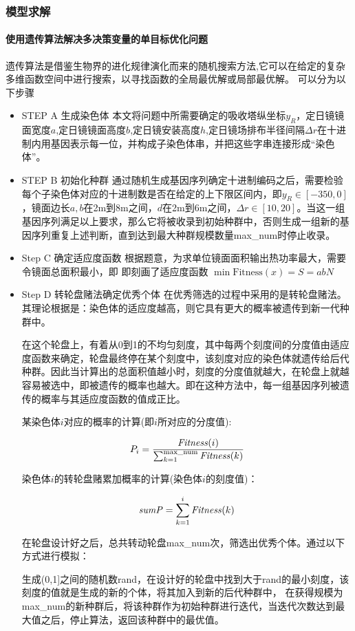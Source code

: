 \subsubsection{模型求解}
\paragraph{使用遗传算法解决多决策变量的单目标优化问题}
遗传算法是借鉴生物界的进化规律演化而来的随机搜索方法,它可以在给定的复杂多维函数空间中进行搜索，以寻找函数的全局最优解或局部最优解。
可以分为以下步骤
\begin{itemize}
\item STEP A 生成染色体
本文将问题中所需要确定的吸收塔纵坐标\(y_{R}\)，定日镜镜面宽度\(a\),定日镜镜面高度\(b\),定日镜安装高度\(h\),定日镜场排布半径间隔\(\Delta r\)在十进制内用基因表示每一位，并构成子染色体串，并把这些字串连接形成“染色体”。
\item 
STEP B    初始化种群
通过随机生成基因序列确定十进制编码之后，需要检验每个子染色体对应的十进制数是否在给定的上下限区间内，即\(y_{R} \in [-350 ,0]\)，镜面边长\(a, b\)在2m到8m之间，\(d\)在2m到6m之间，\(\Delta r \in [10, 20]\)。当这一组基因序列满足以上要求，那么它将被收录到初始种群中，否则生成一组新的基因序列重复上述判断，直到达到最大种群规模数量max\_num时停止收录。
\item 
Step C   确定适应度函数
根据题意，为求单位镜面面积输出热功率最大，需要令镜面总面积最小，即
即刻画了适应度函数 \(\min \mathrm{Fitness}(x) = S = a  b  N\)
\item 
Step D   转轮盘赌法确定优秀个体
在优秀筛选的过程中采用的是转轮盘赌法。其理论根据是：染色体的适应度越高，则它具有更大的概率被遗传到新一代种群中。
	
在这个轮盘上，有着从0到1的不均匀刻度，其中每两个刻度间的分度值由适应度函数来确定，轮盘最终停在某个刻度中，该刻度对应的染色体就遗传给后代种群。因此当计算出的总面积值越小时，刻度的分度值就越大，在轮盘上就越容易被选中，即被遗传的概率也越大。即在这种方法中，每一组基因序列被遗传的概率与其适应度函数的值成正比。
	
某染色体\(i\)对应的概率的计算(即\(i\)所对应的分度值):

\begin{equation}
P_{i} = \frac{{\it Fitness}(i)}{\sum_{k=1} ^{\text{max\_num}} {\it Fitness} (k)}
\end{equation}
	
染色体\(i\)的转轮盘赌累加概率的计算(染色体\(i\)的刻度值)：

\begin{equation}
{\it sum P} = \sum_{k=1} ^{i} {\it Fitness} (k)
\end{equation}

在轮盘设计好之后，总共转动轮盘max\_num次，筛选出优秀个体。通过以下方式进行模拟：

生成(0,1]之间的随机数rand，在设计好的轮盘中找到大于rand的最小刻度，该刻度的值就是生成的新的个体，将其加入到新的后代种群中，
在获得规模为max\_num的新种群后，将该种群作为初始种群进行迭代，当迭代次数达到最大值之后，停止算法，返回该种群中的最优值。
\end{itemize}

